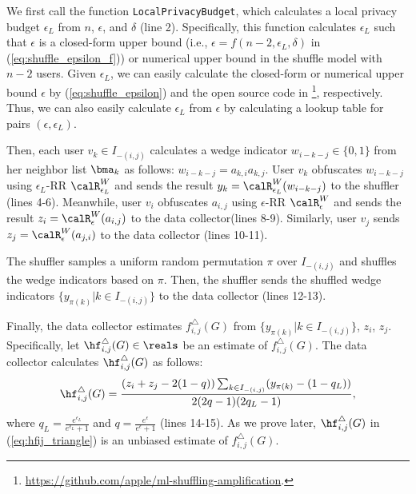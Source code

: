 We first call the function \texttt{LocalPrivacyBudget}, which calculates a local privacy budget $\epsilon_L$ from $n$, $\epsilon$, and $\delta$ (line 2). 
Specifically, this function calculates $\epsilon_L$ 
such that $\epsilon$ is a closed-form upper bound (i.e., $\epsilon = f(n-2, \epsilon_L, \delta)$ in (\ref{eq:shuffle_epsilon_f})) or numerical upper bound in the shuffle model with $n-2$ users. 
Given $\epsilon_L$, we can easily calculate the closed-form or numerical upper bound $\epsilon$ by (\ref{eq:shuffle_epsilon}) and the open source code in \cite{Feldman_FOCS21}\footnote{\url{https://github.com/apple/ml-shuffling-amplification}.}, respectively. 
Thus, we can also easily calculate $\epsilon_L$ from $\epsilon$ by calculating a lookup table for pairs $(\epsilon, \epsilon_L)$. 

Then, each user $v_k \in I_{-(i,j)}$ calculates a wedge indicator $w_{i-k-j} \in \{0,1\}$ from her neighbor list $\bma_k$ as follows: $w_{i-k-j} = a_{k,i} a_{k,j}$. 
User $v_k$ obfuscates $w_{i-k-j}$ using $\epsilon_L$-RR $\calR_{\epsilon_L}^W$ and sends the result $y_k = \calR_{\epsilon_L}^W(w_{i-k-j})$ to the shuffler (lines 4-6). 
Meanwhile, user $v_i$ obfuscates $a_{i,j}$ using $\epsilon$-RR $\calR_{\epsilon}^W$ and sends the result $z_i = \calR_{\epsilon}^W(a_{i,j})$ to the data collector\footnotemark[1] (lines 8-9). 
Similarly, user $v_j$ sends $z_j = \calR_{\epsilon}^W(a_{j,i})$ to the data collector (lines 10-11). 

The shuffler samples a uniform random permutation $\pi$ over $I_{-(i,j)}$ and shuffles the wedge indicators based on $\pi$. 
Then, the shuffler sends the shuffled wedge indicators $\{y_{\pi(k)} | k \in I_{-(i,j)}\}$ to the data collector (lines 12-13). 

Finally, the data collector estimates $f_{i,j}^\triangle(G)$ from $\{y_{\pi(k)} | k \in I_{-(i,j)}\}$, $z_i$, $z_j$. 
Specifically, let $\hf_{i,j}^\triangle(G) \in \reals$ be an estimate of $f_{i,j}^\triangle(G)$. 
The data collector calculates $\hf_{i,j}^\triangle(G)$ as follows: 
\begin{align}
    \hf_{i,j}^\triangle(G) = \frac{(z_i+z_j-2(1-q))\sum_{k \in I_{-(i,j)}} (y_{\pi(k)} - (1-q_L))}{2(2q-1)(2q_L-1)},
    \label{eq:hfij_triangle}
\end{align}
where $q_L = \frac{e^{\epsilon_L}}{e^{\epsilon_L}+1}$ and $q = \frac{e^\epsilon}{e^\epsilon+1}$ (lines 14-15). 
As we prove later, $\hf_{i,j}^\triangle(G)$ in (\ref{eq:hfij_triangle}) is an unbiased estimate of $f_{i,j}^\triangle(G)$. 

